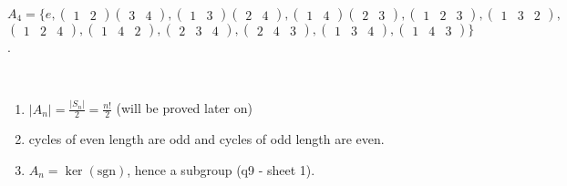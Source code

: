 \begin{example}
$A_4 = \{ e, \begin{pmatrix}1 & 2\end{pmatrix} \begin{pmatrix}3 & 4\end{pmatrix}, \begin{pmatrix}1 & 3\end{pmatrix} \begin{pmatrix}2 & 4\end{pmatrix}, \begin{pmatrix}1 & 4\end{pmatrix} \begin{pmatrix}2 & 3\end{pmatrix},\begin{pmatrix}1 & 2 & 3\end{pmatrix}, \begin{pmatrix}1 & 3 & 2\end{pmatrix},$ \\
$\begin{pmatrix}1 & 2 & 4\end{pmatrix}, \begin{pmatrix}1 & 4 & 2\end{pmatrix},\begin{pmatrix}2 & 3 & 4\end{pmatrix}, \begin{pmatrix}2 & 4 & 3\end{pmatrix}, \begin{pmatrix}1 & 3 & 4\end{pmatrix}, \begin{pmatrix}1 & 4 & 3\end{pmatrix} \}$.
\end{example}

\begin{remark} ~
  \begin{enumerate}
  \def\labelenumi{\roman{enumi}.}
  \item
    $|A_n| = \frac{|S_n|}{2} = \frac{n!}{2}$ (will be proved later on)
  \item
    cycles of even length are odd and cycles of odd length are even.
  \item
    $A_n = \ker (\text{sgn})$, hence a subgroup (q9 - sheet 1).
  \end{enumerate}
\end{remark}